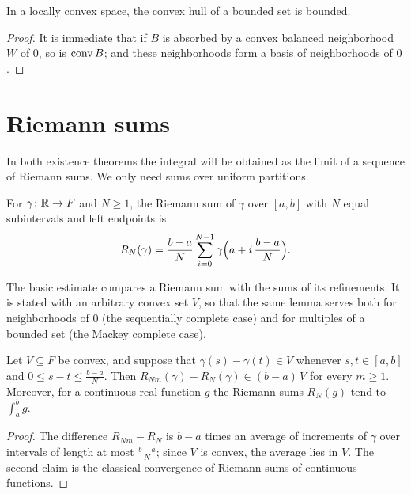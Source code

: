 \begin{lemma}
  \label{lem:conv-bounded}
  \leanok
  In a locally convex space, the convex hull of a bounded set is bounded.
\end{lemma}

\begin{proof}
  \leanok
  It is immediate that if $B$ is absorbed by a convex balanced neighborhood $W$ of $0$, so is
  $\operatorname{conv} B$; and these neighborhoods form a basis of neighborhoods of $0$.
\end{proof}

\section{Riemann sums}
\label{sec:riemann}

In both existence theorems the integral will be obtained as the limit of a sequence of Riemann
sums. We only need sums over uniform partitions.

\begin{definition}
  \label{def:riemann}
  \leanok
  For $\gamma \colon \mathbb{R} \to F$ and $N \geq 1$, the Riemann sum of $\gamma$ over $[a, b]$ with
  $N$ equal subintervals and left endpoints is
  \[
    R_N(\gamma) = \frac{b-a}{N} \sum_{i=0}^{N-1} \gamma\Bigl(a + i\, \frac{b-a}{N}\Bigr).
  \]
\end{definition}

The basic estimate compares a Riemann sum with the sums of its refinements. It is stated with an
arbitrary convex set $V$, so that the same lemma serves both for neighborhoods of $0$ (the
sequentially complete case) and for multiples of a bounded set (the Mackey complete case).

\begin{lemma}[Refinements]
  \label{lem:riemann-refine}
  \leanok
  Let $V \subseteq F$ be convex, and suppose that $\gamma(s) - \gamma(t) \in V$ whenever
  $s, t \in [a, b]$ and $0 \leq s - t \leq \frac{b - a}{N}$. Then
  $R_{Nm}(\gamma) - R_N(\gamma) \in (b - a)\, V$ for every $m \geq 1$. Moreover, for a continuous
  real function $g$ the Riemann sums $R_N(g)$ tend to $\int_a^b g$.
\end{lemma}

\begin{proof}
  \leanok
  The difference $R_{Nm} - R_N$ is $b - a$ times an average of increments of $\gamma$ over
  intervals of length at most $\frac{b - a}{N}$; since $V$ is convex, the average lies in $V$.
  The second claim is the classical convergence of Riemann sums of continuous functions.
\end{proof}


